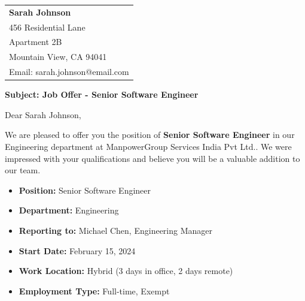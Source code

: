 \documentclass[a4paper,8pt]{article}
\begin{document}
\vspace{0.1cm}
\noindent\hrulefill
\vspace{0.2cm}


\begin{tabular}{@{}l@{}}
    
    \textbf{Sarah Johnson} \\
    
    
    
    456 Residential Lane\\Apartment 2B\\Mountain View, CA 94041 \\
    
    
    
    Email: sarah.johnson@email.com \\
    
\end{tabular} 

\vspace{0.2cm}

\textbf{Subject: Job Offer - Senior Software Engineer}

\vspace{0.4cm}

Dear Sarah Johnson,

\vspace{0.4cm}

We are pleased to offer you the position of \textbf{Senior Software Engineer} in our Engineering department at ManpowerGroup Services India Pvt Ltd.. We were impressed with your qualifications and believe you will be a valuable addition to our team.

\vspace{0.4cm}


\begin{tcolorbox}[
    colback=blue!5!white,
    colframe=blue!75!black,
    title=Position Details,
    fonttitle=\bfseries
]

\end{tcolorbox} 

\begin{itemize}[leftmargin=20pt]
    \item \textbf{Position:} Senior Software Engineer
    \item \textbf{Department:} Engineering
    \item \textbf{Reporting to:} Michael Chen, Engineering Manager
    \item \textbf{Start Date:} February 15, 2024
    \item \textbf{Work Location:} Hybrid (3 days in office, 2 days remote)
    \item \textbf{Employment Type:} Full-time, Exempt
\end{itemize}
\end{document}
